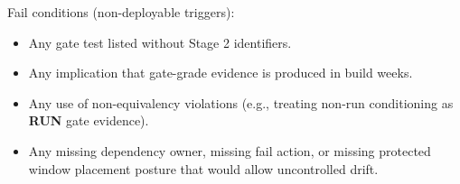\documentclass[10pt]{article}
\begin{document}
Fail conditions (non-deployable triggers):

\begin{itemize}
\item Any gate test listed without Stage 2 identifiers.
\item Any implication that gate-grade evidence is produced in build weeks.
\item Any use of non-equivalency violations (e.g., treating non-run conditioning as \textbf{RUN} gate evidence).
\item Any missing dependency owner, missing fail action, or missing protected window placement posture that would allow uncontrolled drift.
\end{itemize}
\end{document}
